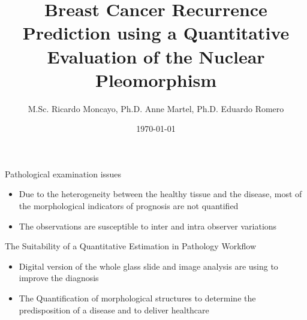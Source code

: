 \documentclass[usenames,dvipsnames]{beamer}
\author{M.Sc. Ricardo Moncayo, Ph.D. Anne Martel, Ph.D. Eduardo Romero}
\title{Breast Cancer Recurrence Prediction using a Quantitative Evaluation of the Nuclear Pleomorphism}
\institute{Departamento Ingeniería \\ Eléctrica}
\date{\today}
\begin{document}
\begin{frame}[plain]
\maketitle
\small
{\centering\itshape \par}
\par\medskip

\end{frame}


\begin{frame}{Pathological examination issues}
	\begin{itemize}
	 \item Due to the heterogeneity between the healthy tissue and the disease, most of the morphological indicators of prognosis are not quantified
     \pause
	 \item The observations are susceptible to inter and intra observer variations
	 
	\end{itemize}
\end{frame}

\begin{frame}{The Suitability of a Quantitative Estimation in Pathology Workflow}
 \begin{itemize}
  \item Digital version of the whole glass slide and image analysis are using to improve the diagnosis
  \pause

  \item The Quantification of morphological structures to determine the predisposition of a disease and to deliver healthcare%
  
  
  
 \end{itemize}
\end{frame}
\end{document}
